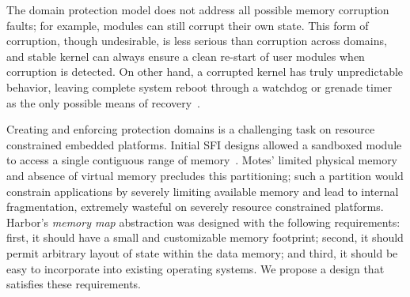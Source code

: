 The domain protection model does not address all possible memory corruption
faults; for example,
% 
modules can still corrupt their own state.
% 
This form of corruption, though undesirable, is less serious than
corruption across domains, and stable kernel can always ensure a clean
re-start of user modules when corruption is detected.
% 
On other hand, a corrupted kernel has truly unpredictable behavior,
leaving complete system reboot through a watchdog or grenade timer as
the only possible means of recovery~\cite{dutta05ipsn}.
%


Creating and enforcing protection domains is a challenging task on
resource constrained embedded platforms.
%
Initial SFI designs allowed a sandboxed module to access a single
contiguous range of memory~\cite{wahbe93sfi}.
%
Motes' limited physical memory and absence
of virtual memory precludes this partitioning; such a partition would
constrain applications by severely limiting available memory and lead
to internal fragmentation, extremely wasteful on severely resource
constrained platforms.
%
%
Harbor's \emph{memory map} abstraction was designed with the following
requirements:
%
first, it should have a small and customizable memory footprint;
%
second, it should permit arbitrary layout of state within the data memory;
%
and third, it should be easy to incorporate into existing
operating systems.
%
We propose a design that satisfies these requirements.
%

